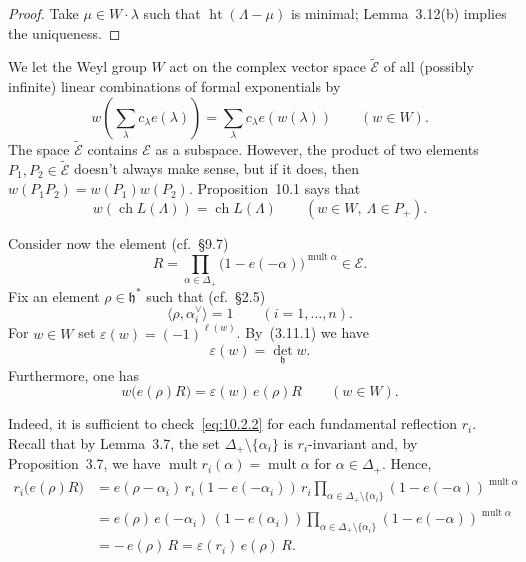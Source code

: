 \documentclass[12pt]{article}
\begin{document}
\begin{proof}
    Take $\mu \in W \cdot \lambda$ such that
    $\operatorname{ht}(\Lambda - \mu)$ is minimal;
    Lemma~3.12(b) implies the uniqueness.
\end{proof}

We let the Weyl group $W$ act on the complex vector space $\widetilde{\mathcal{E}}$
of all (possibly infinite) linear combinations of formal exponentials by
\[
    w\!\left( \sum_{\lambda} c_\lambda e(\lambda) \right)
    = \sum_{\lambda} c_\lambda e(w(\lambda))
    \qquad (w \in W).
\]
The space $\widetilde{\mathcal{E}}$ contains $\mathcal{E}$ as a subspace.
However, the product of two elements $P_1, P_2 \in \widetilde{\mathcal{E}}$
doesn't always make sense, but if it does, then
$w(P_1 P_2) = w(P_1) w(P_2)$.
Proposition~10.1 says that
\begin{equation}\label{eq:10.2.1}
    w(\operatorname{ch} L(\Lambda)) = \operatorname{ch} L(\Lambda)
    \qquad (w \in W,\ \Lambda \in P_+).
\end{equation}

Consider now the element (cf.\ \S9.7)
\[
    R = \prod_{\alpha \in \Delta_+} \bigl(1 - e(-\alpha)\bigr)^{\operatorname{mult}\alpha}
    \in \mathcal{E}.
\]
Fix an element $\rho \in \mathfrak{h}^*$ such that (cf.\ \S2.5)
\[
    \langle \rho, \alpha_i^\vee \rangle = 1 \qquad (i=1,\dots,n).
\]
For $w \in W$ set $\varepsilon(w) = (-1)^{\ell(w)}$.
By~(3.11.1) we have
\[
    \varepsilon(w) = \det_{\mathfrak{h}} w.
\]
Furthermore, one has
\begin{equation}\label{eq:10.2.2}
    w\bigl(e(\rho)R\bigr) = \varepsilon(w)\, e(\rho)R
    \qquad (w \in W).
\end{equation}

Indeed, it is sufficient to check~\eqref{eq:10.2.2}
for each fundamental reflection $r_i$.
Recall that by Lemma~3.7, the set
$\Delta_+ \setminus \{\alpha_i\}$ is $r_i$-invariant and, by
Proposition~3.7, we have $\operatorname{mult} r_i(\alpha)
    = \operatorname{mult}\alpha$ for $\alpha \in \Delta_+$.
Hence,
\[
    \begin{aligned}
        r_i\bigl(e(\rho)R\bigr)
         & = e(\rho - \alpha_i)\, r_i(1 - e(-\alpha_i))\, r_i
        \!\!\prod_{\alpha \in \Delta_+ \setminus \{\alpha_i\}}\!
        (1 - e(-\alpha))^{\operatorname{mult}\alpha}          \\[4pt]
         & = e(\rho)\, e(-\alpha_i)\, (1 - e(\alpha_i))
        \!\!\prod_{\alpha \in \Delta_+ \setminus \{\alpha_i\}}\!
        (1 - e(-\alpha))^{\operatorname{mult}\alpha}          \\[4pt]
         & = -\, e(\rho)\, R
        = \varepsilon(r_i)\, e(\rho)\, R.
    \end{aligned}
\]
\end{document}

